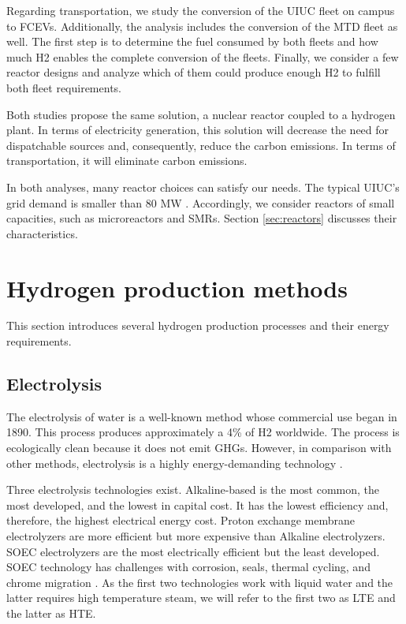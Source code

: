 \documentclass[11pt,letterpaper]{article}
\begin{document}
Regarding transportation, we study the conversion of the \gls{UIUC} fleet on campus to \glspl{FCEV}.
Additionally, the analysis includes the conversion of the \gls{MTD} fleet as well.
The first step is to determine the fuel consumed by both fleets and how much \gls{H2} enables the complete conversion of the fleets.
Finally, we consider a few reactor designs and analyze which of them could produce enough \gls{H2} to fulfill both fleet requirements.

Both studies propose the same solution, a nuclear reactor coupled to a hydrogen plant.
In terms of electricity generation, this solution will decrease the need for dispatchable sources and, consequently, reduce the carbon emissions.
In terms of transportation, it will eliminate carbon emissions.

In both analyses, many reactor choices can satisfy our needs.
The typical \gls{UIUC}'s grid demand is smaller than 80 MW \cite{dotson_optimal_2020}.
Accordingly, we consider reactors of small capacities, such as microreactors and \glspl{SMR}.
Section \ref{sec:reactors} discusses their characteristics.

\section{Hydrogen production methods}
\label{sec:hydro}

This section introduces several hydrogen production processes and their energy requirements.

\subsection{Electrolysis}

The electrolysis of water is a well-known method whose commercial use began in 1890.
This process produces approximately a 4\% of \gls{H2} worldwide.
The process is ecologically clean because it does not emit \glspl{GHG}.
However, in comparison with other methods, electrolysis is a highly energy-demanding technology \cite{kalamaras_hydrogen_2013}.

Three electrolysis technologies exist.
Alkaline-based is the most common, the most developed, and the lowest in capital cost.
It has the lowest efficiency and, therefore, the highest electrical energy cost.
Proton exchange membrane electrolyzers are more efficient but more expensive than Alkaline electrolyzers.
\gls{SOEC} electrolyzers are the most electrically efficient but the least developed.
\gls{SOEC} technology has challenges with corrosion, seals, thermal cycling, and chrome migration \cite{kalamaras_hydrogen_2013}.
As the first two technologies work with liquid water and the latter requires high temperature steam, we will refer to the first two as \gls{LTE} and the latter as \gls{HTE}.
\end{document}
